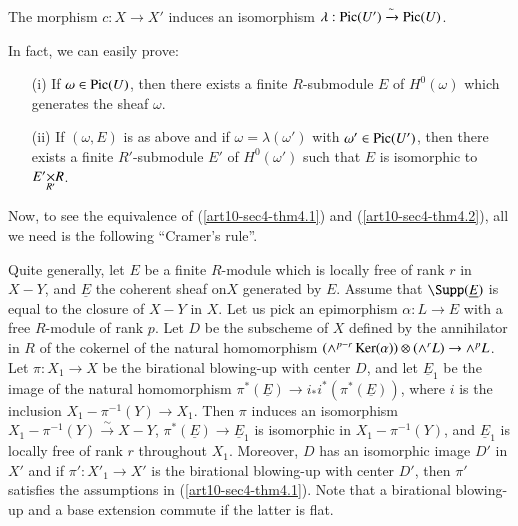\begin{theorem}\label{art10-sec4-thm4.2}
The morphism $c:X\to X'$ induces an isomorphism $\lambda:\operatorname{\mathrm{Pic}}(U')\xrightarrow{\sim}\operatorname{\mathrm{Pic}}(U)$.
\end{theorem}

In fact, we can easily prove:
\begin{itemize}
\item[(i)] If $\omega\in \operatorname{\mathrm{Pic}}(U)$, then there exists a finite $R$-submodule $E$ of $H^{0}(\omega)$ which generates the sheaf $\omega$.

\item[(ii)] If $(\omega,E)$ is as above and if $\omega=\lambda(\omega')$ with $\omega'\in \operatorname{\mathrm{Pic}}(U')$, then there exists a finite $R'$-submodule $E'$ of $H^{0}(\omega')$ such that $E$ is isomorphic to $\fprod{E'}{R}{R'}$.
\end{itemize}
Now, to see the equivalence of (\ref{art10-sec4-thm4.1}) and (\ref{art10-sec4-thm4.2}), all we need is the following ``Cramer's rule''.

\begin{remark}\label{art10-sec4-rem4.3}
Quite generally, let $E$ be a finite $R$-module which is locally free of rank $r$ in $X-Y$, and $\underline{E}$ the coherent sheaf on\pageoriginale $X$ generated by $E$. Assume that $\Supp(\underline{E})$ is equal to the closure of $X-Y$ in $X$. Let us pick an epimorphism $\alpha:L\to E$ with a free $R$-module of rank $p$. Let $D$ be the subscheme of $X$ defined by the annihilator in $R$ of the cokernel of the natural homomorphism $(\wedge^{p-r}\operatorname{\mathrm{Ker}}(\alpha))\otimes (\wedge {}^{r}L)\to \wedge {}^{p}L$. Let $\pi:X_{1}\to X$ be the birational blowing-up with center $D$, and let $\underline{E}_{1}$ be the image of the natural homomorphism $\pi^{*}(\underline{E})\to i_{*}i^{*}(\pi^{*}(\underline{E}))$, where $i$ is the inclusion $X_{1}-\pi^{-1}(Y)\to X_{1}$. Then $\pi$ induces an isomorphism $X_{1}-\pi^{-1}(Y)\xrightarrow{\sim}X-Y$, $\pi^{*}(\underline{E})\to \underline{E}_{1}$ is isomorphic in $X_{1}-\pi^{-1}(Y)$, and $\underline{E}_{1}$ is locally free of rank $r$ throughout $X_{1}$. Moreover, $D$ has an isomorphic image $D'$ in $X'$ and if $\pi':X'_{1}\to X'$ is the birational blowing-up with center $D'$, then $\pi'$ satisfies the assumptions in (\ref{art10-sec4-thm4.1}). Note that a birational blowing-up and a base extension commute if the latter is flat.
\end{remark}

